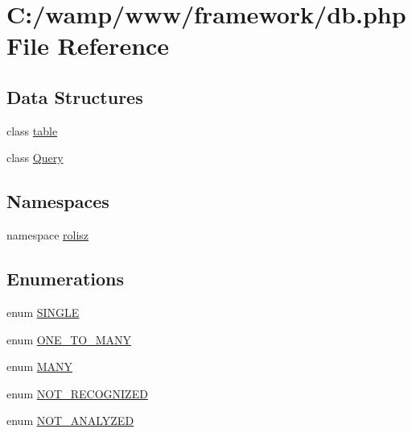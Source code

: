 \hypertarget{db_8php}{
\section{C:/wamp/www/framework/db.php File Reference}
\label{db_8php}
}
\subsection*{Data Structures}
\begin{DoxyCompactItemize}
\item 
class \hyperlink{classtable}{table}
\item 
class \hyperlink{class_query}{Query}
\end{DoxyCompactItemize}
\subsection*{Namespaces}
\begin{DoxyCompactItemize}
\item 
namespace \hyperlink{namespacerolisz}{rolisz}
\end{DoxyCompactItemize}
\subsection*{Enumerations}
\begin{DoxyCompactItemize}
\item 
enum \hyperlink{db_8php_a76b06276bbadc1b8d9e716c5d9326919}{SINGLE} 
\item 
enum \hyperlink{db_8php_ad2a8019952a8ce0c04e4fb3fbb4fe266}{ONE\_\-TO\_\-MANY} 
\item 
enum \hyperlink{db_8php_a0146ef09f9a37e6ec7dbd719390f9de4}{MANY} 
\item 
enum \hyperlink{db_8php_a1b965efd4e0428b37a632346f4eef7e1}{NOT\_\-RECOGNIZED} 
\item 
enum \hyperlink{db_8php_ab2ccf7b117b4b822d61c1a3a07a528a2}{NOT\_\-ANALYZED} 
\end{DoxyCompactItemize}


